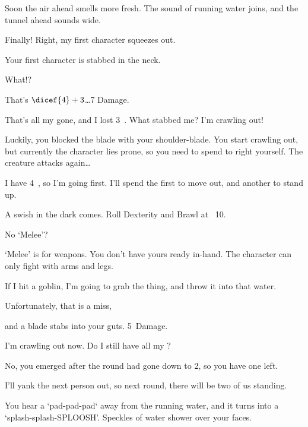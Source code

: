 \begin{multicols}{2}
\null
\begin{description}\sf
  \item[\Gls{gm}:]
  Soon the air ahead smells more fresh.
  The sound of running water joins, and the tunnel ahead sounds wide.
  \item[Player 3:]
  Finally!
  Right, my first character squeezes out.
  \item[\Glsentrytext{gm}:]
  Your first character is stabbed in the neck.
  \item[Player 3:]
  What!?
  \item[\Gls{gm}:]
  That's $\dicef{4}+3$\ldots 7 Damage.
  \item[Player 3:]
  That's all my  gone, and I lost 3~.
  What stabbed me?
  I'm crawling out!
  \item[\Gls{gm}:]
  Luckily, you blocked the blade with your shoulder-blade.
  You start crawling out, but currently the character lies prone, so you need to spend  to right yourself.
  The creature attacks again\ldots
  \item[Player 3:]
  I have 4~, so I'm going first.
  I'll spend the first  to move out, and another to stand up.
  \item[\Gls{gm}:]
  A swish in the dark comes.
  Roll Dexterity and Brawl at ~10.
  \item[Player 3:]
  No `Melee'?
  \item[\Gls{gm}:]
  `Melee' is  for weapons.
  You don't have yours ready in-hand.
  The character can only fight with arms and legs.
  \item[Player 3:]
  If I hit a goblin, I'm going to grab the thing, and throw it into that water.
  \item[Player 3:]
  Unfortunately, that is a miss,
  \item[\Gls{gm}:]
  and a blade stabs into your guts.
  5~Damage.
  \item[Player 1:]
  I'm crawling out now.
  Do I still have all my ?
  \item[\Glsentrytext{gm}:]
  No, you emerged after the \gls{round} had gone down to 2, so you have one  left.
  \item[Player 1:]
  I'll yank the next person out, so next \gls{round}, there will be two of us standing.
  \item[\Glsentrytext{gm}:]
  You hear a `pad-pad-pad` away from the running water, and it turns into a `splash-splash-SPLOOSH'.
  Speckles of water shower over your faces.
\end{description}


\end{multicols}
